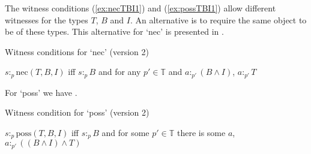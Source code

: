 The witness conditions (\ref{ex:necTBI1}) and (\ref{ex:possTBI1})
allow different witnesses for the types $T$, $B$ and $I$.  An
alternative is to require the same object to be of these types. This
alternative for `nec' is presented in \nexteg{}.
\begin{ex}
  Witness conditions for `nec' (version 2)

  $s:_p\text{nec}(T,B,I)$ iff $s:_pB$ and for any $p'\in\mathbb{T}$ and 
  $a:_{p'}(B\wedge I)$, $a:_{p'}T$

  
  

  
  
    
 
\label{ex:necTBI2}   
\end{ex}
For `poss' we have \nexteg{}.
\begin{ex}
  Witness condition for `poss' (version 2)

  $s:_p\text{poss}(T,B,I)$ iff $s:_pB$ and for some $p'\in\mathbb{T}$
  there is some $a$, $a:_{p'}((B\wedge I)\wedge T)$ 
 
 
  
 
\label{ex:possTBI2}
   
\end{ex} 
 
